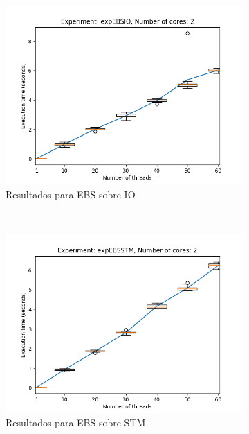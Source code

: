 \clearpage
\begin{figure}[H]
    \centering
    \begin{subfigure}[b]{0.49\textwidth}
        \includegraphics[width=\textwidth]{images/numberOfThreads/plots/expEBSIO-2}
        \caption{Resultados para EBS sobre IO}
        \label{subfig:numberOfThreads-ebsio-2}
    \end{subfigure}
    ~
    \begin{subfigure}[b]{0.49\textwidth}
        \includegraphics[width=\textwidth]{images/numberOfThreads/plots/expEBSSTM-2}
        \caption{Resultados para EBS sobre STM}
        \label{subfig:numberOfThreads-ebsstm-2}
    \end{subfigure}
    \begin{subfigure}[b]{0.49\textwidth}

\end{subfigure}
\end{figure}
